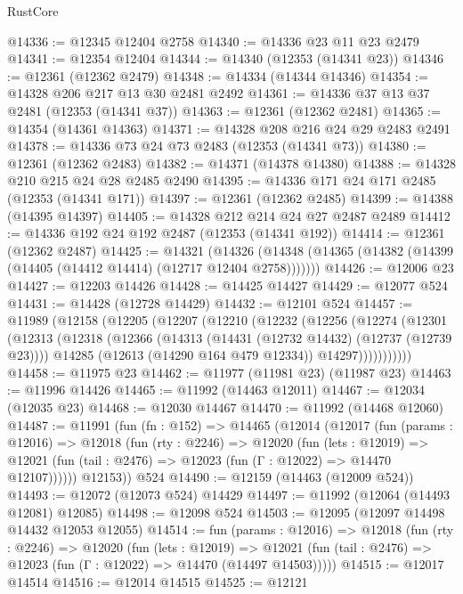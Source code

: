 \begin{lexlean}{RustCore}
\begin{coremodule}
@14336 := @12345 @12404 @2758
@14340 := @14336 @23 @11 @23 @2479
@14341 := @12354 @12404
@14344 := @14340 (@12353 (@14341 @23))
@14346 := @12361 (@12362 @2479)
@14348 := @14334 (@14344 @14346)
@14354 := @14328 @206 @217 @13 @30 @2481 @2492
@14361 := @14336 @37 @13 @37 @2481 (@12353 (@14341 @37))
@14363 := @12361 (@12362 @2481)
@14365 := @14354 (@14361 @14363)
@14371 := @14328 @208 @216 @24 @29 @2483 @2491
@14378 := @14336 @73 @24 @73 @2483 (@12353 (@14341 @73))
@14380 := @12361 (@12362 @2483)
@14382 := @14371 (@14378 @14380)
@14388 := @14328 @210 @215 @24 @28 @2485 @2490
@14395 := @14336 @171 @24 @171 @2485 (@12353 (@14341 @171))
@14397 := @12361 (@12362 @2485)
@14399 := @14388 (@14395 @14397)
@14405 := @14328 @212 @214 @24 @27 @2487 @2489
@14412 := @14336 @192 @24 @192 @2487 (@12353 (@14341 @192))
@14414 := @12361 (@12362 @2487)
@14425 := @14321
    (@14326 (@14348 (@14365 (@14382 (@14399 (@14405 (@14412 @14414) (@12717 @12404 @2758)))))))
@14426 := @12006 @23
@14427 := @12203 @14426
@14428 := @14425 @14427
@14429 := @12077 @524
@14431 := @14428 (@12728 @14429)
@14432 := @12101 @524
@14457 := @11989
    (@12158
      (@12205
        (@12207
          (@12210
            (@12232
              (@12256
                (@12274
                  (@12301
                    (@12313
                      (@12318
                        (@12366
                          (@14313 (@14431 (@12732 @14432) (@12737 (@12739 @23))))
                          @14285
                          (@12613 (@14290 @164 @479 @12334))
                          @14297)))))))))))
@14458 := @11975 @23
@14462 := @11977 (@11981 @23) (@11987 @23)
@14463 := @11996 @14426
@14465 := @11992 (@14463 @12011)
@14467 := @12034 (@12035 @23)
@14468 := @12030 @14467
@14470 := @11992 (@14468 @12060)
@14487 := @11991
    (fun (fn : @152) =>
    @14465
      (@12014
        (@12017
          (fun (params : @12016) =>
          @12018
            (fun (rty : @2246) =>
            @12020
              (fun (lets : @12019) =>
              @12021 (fun (tail : @2476) => @12023 (fun (Γ : @12022) => @14470 @12107))))))
        @12153))
    @524
@14490 := @12159 (@14463 (@12009 @524))
@14493 := @12072 (@12073 @524) @14429
@14497 := @11992 (@12064 (@14493 @12081) @12085)
@14498 := @12098 @524
@14503 := @12095 (@12097 @14498 @14432 @12053 @12055)
@14514 := fun (params : @12016) =>
  @12018
    (fun (rty : @2246) =>
    @12020
      (fun (lets : @12019) =>
      @12021 (fun (tail : @2476) => @12023 (fun (Γ : @12022) => @14470 (@14497 @14503)))))
@14515 := @12017 @14514
@14516 := @12014 @14515
@14525 := @12121

\end{coremodule}
\end{lexlean}
